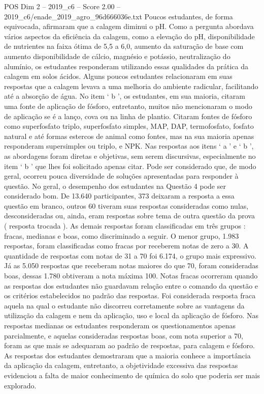\begin{textsample}{POS Dim 2 – 2019\_c6 – Score 2.00 – 2019\_c6/enade\_2019\_agro\_96d666036e.txt}
Poucos estudantes, de forma equivocada, afirmaram que a calagem diminui o pH.
Como a pergunta abordava vários aspectos da eficiência da calagem, como a elevação do pH, disponibilidade de nutrientes na faixa ótima de 5,5 a 6,0, aumento da saturação de base com aumento disponibilidade de cálcio, magnésio e potássio, neutralização do alumínio, os estudantes responderam utilizando essas qualidades da prática da calagem em solos ácidos.
Alguns poucos estudantes relacionaram em suas respostas que a calagem levava a uma melhoria do ambiente radicular, facilitando até a absorção de água.
No item ‘ b ’, os estudantes, em sua maioria, citaram uma fonte de aplicação de fósforo, entretanto, muitos não mencionaram o modo de aplicação se é a lanço, cova ou na linha de plantio.
Citaram fontes de fósforo como superfosfato triplo, superfosfato simples, MAP, DAP, termofosfato, fosfato natural e até formas estercos de animal como fontes, mas na sua maioria apenas responderam supersimples ou triplo, e NPK.
Nas respostas aos itens ‘ a ’ e ‘ b ’, as abordagens foram diretas e objetivas, sem serem discursivas, especialmente no item ‘ b ’ que lhes foi solicitado apenas citar.
Pode ser considerado que, de modo geral, ocorreu pouca diversidade de soluções apresentadas para responder à questão.
No geral, o desempenho dos estudantes na Questão 4 pode ser considerado bom.
De 13.640 participantes, 373 deixaram a resposta a essa questão em branco, outros 60 tiveram suas respostas consideradas como nulas, desconsideradas ou, ainda, eram respostas sobre tema de outra questão da prova ( resposta trocada ).
As demais respostas foram classificadas em três grupos : fracas, medianas e boas, como discriminado a seguir.
O menor grupo, 1.983 respostas, foram classificadas como fracas por receberem notas de zero a 30.
A quantidade de respostas com notas de 31 a 70 foi 6.174, o grupo mais expressivo.
Já as 5.050 respostas que receberam notas maiores do que 70, foram consideradas boas, dessas 1.780 obtiveram a nota máxima 100.
Notas fracas ocorreram quando as respostas dos estudantes não guardavam relação entre o comando da questão e os critérios estabelecidos no padrão das respostas.
Foi considerada resposta fraca aquela na qual o estudante não discorreu corretamente sobre as vantagens da utilização da calagem e nem da aplicação, uso e local da aplicação de fósforo.
Nas respostas medianas os estudantes responderam os questionamentos apenas parcialmente, e aquelas consideradas respostas boas, com nota superior a 70, foram as que mais se adequaram ao padrão de respostas, para calagem e fósforo.
As respostas dos estudantes demostraram que a maioria conhece a importância da aplicação da calagem, entretanto, a objetividade excessiva das respostas evidenciou a falta de maior conhecimento de química do solo que poderia ser mais explorado.

\end{textsample}

